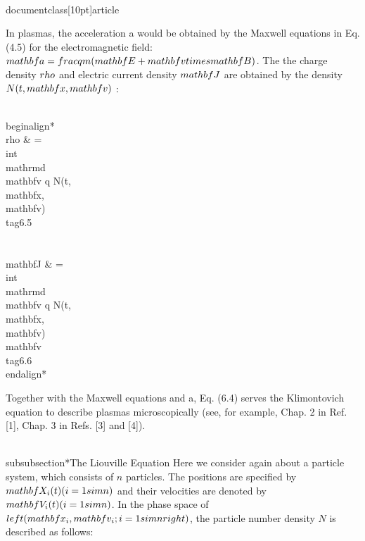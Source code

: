 \\documentclass[10pt]{article}
\begin{document}
{{{{In plasmas, the acceleration a would be obtained by the Maxwell equations in Eq. (4.5) for the electromagnetic field: $\\mathbf{a}=\\frac{q}{m}(\\mathbf{E}+\\mathbf{v} \\times \\mathbf{B})$. The the charge density $\\rho$ and electric current density $\\mathbf{J}$ are obtained by the density $N(t, \\mathbf{x}, \\mathbf{v})$ :


\\begin{align*}
\\rho & =\\int \\mathrm{d} \\mathbf{v} q N(t, \\mathbf{x}, \\mathbf{v})  \\tag{6.5}\\\\
\\mathbf{J} & =\\int \\mathrm{d} \\mathbf{v} q N(t, \\mathbf{x}, \\mathbf{v}) \\mathbf{v} \\tag{6.6}
\\end{align*}


Together with the Maxwell equations and a, Eq. (6.4) serves the Klimontovich equation to describe plasmas microscopically (see, for example, Chap. 2 in Ref. [1], Chap. 3 in Refs. [3] and [4]).

\\subsubsection*{The Liouville Equation}
Here we consider again about a particle system, which consists of $n$ particles. The positions are specified by $\\mathbf{X}_{i}(t)(i=1 \\sim n)$ and their velocities are denoted by $\\mathbf{V}_{i}(t)(i=1 \\sim n)$. In the phase space of $\\left(\\mathbf{x}_{i}, \\mathbf{v}_{i} ; i=1 \\sim n\\right)$, the particle number density $N$ is described as follows:


}}}}
\end{document}
